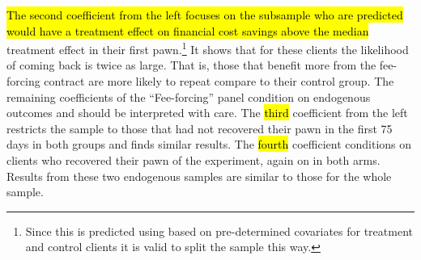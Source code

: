 \documentclass[oneside,11pt]{article}
\begin{document}
\hl{The second coefficient from the left focuses on the subsample who are predicted would have a treatment effect on financial cost savings above the median} treatment effect in their first pawn.\footnote{Since this is predicted using \cite{atheygrf} based on pre-determined covariates for treatment and control clients it is valid to split the sample this way.} It shows that for these clients the likelihood of coming back is twice as large. That is, those that benefit more from the fee-forcing contract are more likely to repeat compare to their control group. The remaining coefficients of the ``Fee-forcing'' panel condition on endogenous outcomes and should be interpreted with care. The \hl{third} coefficient from the left restricts the sample to those that had not recovered their pawn in the first 75 days in both groups and finds similar results. The \hl{fourth} coefficient conditions on clients who recovered their pawn of the experiment, again on in both arms. Results from these two endogenous samples are similar to those for the whole sample.


\end{document}
